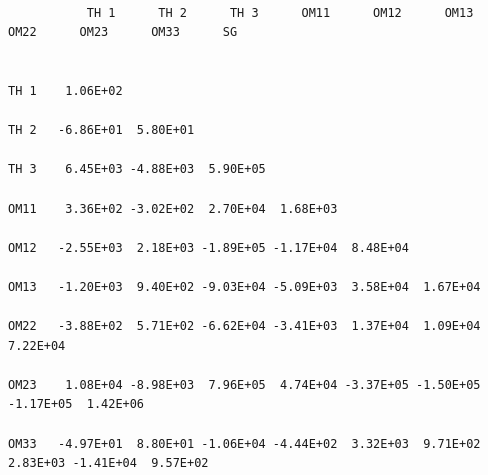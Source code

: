 \documentclass[
  10pt,
]{krantz}
\begin{document}
\begin{verbatim}
                                                                                                       
           TH 1      TH 2      TH 3      OM11      OM12      OM13      OM22      OM23      OM33      SG
                                                                                                       
                                                                                                       
TH 1    1.06E+02                                                                                       
                                                                                                       
TH 2   -6.86E+01  5.80E+01                                                                             
                                                                                                       
TH 3    6.45E+03 -4.88E+03  5.90E+05                                                                   
                                                                                                       
OM11    3.36E+02 -3.02E+02  2.70E+04  1.68E+03                                                         
                                                                                                       
OM12   -2.55E+03  2.18E+03 -1.89E+05 -1.17E+04  8.48E+04                                               
                                                                                                       
OM13   -1.20E+03  9.40E+02 -9.03E+04 -5.09E+03  3.58E+04  1.67E+04                                     
                                                                                                       
OM22   -3.88E+02  5.71E+02 -6.62E+04 -3.41E+03  1.37E+04  1.09E+04  7.22E+04                           
                                                                                                       
OM23    1.08E+04 -8.98E+03  7.96E+05  4.74E+04 -3.37E+05 -1.50E+05 -1.17E+05  1.42E+06                 
                                                                                                       
OM33   -4.97E+01  8.80E+01 -1.06E+04 -4.44E+02  3.32E+03  9.71E+02  2.83E+03 -1.41E+04  9.57E+02       
                                                                                                       

\end{verbatim}
\end{document}

